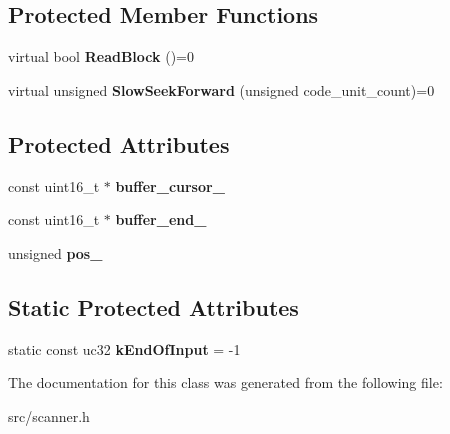 \subsection*{Protected Member Functions}
\begin{DoxyCompactItemize}
\item 
\hypertarget{classv8_1_1internal_1_1_utf16_character_stream_a1b78e988d057208df027c0c83431d590}{}virtual bool {\bfseries Read\+Block} ()=0\label{classv8_1_1internal_1_1_utf16_character_stream_a1b78e988d057208df027c0c83431d590}

\item 
\hypertarget{classv8_1_1internal_1_1_utf16_character_stream_a00765ecbd74b2682be94b1ed489f1849}{}virtual unsigned {\bfseries Slow\+Seek\+Forward} (unsigned code\+\_\+unit\+\_\+count)=0\label{classv8_1_1internal_1_1_utf16_character_stream_a00765ecbd74b2682be94b1ed489f1849}

\end{DoxyCompactItemize}
\subsection*{Protected Attributes}
\begin{DoxyCompactItemize}
\item 
\hypertarget{classv8_1_1internal_1_1_utf16_character_stream_ac90ab8606aa8b34c62cb4d0005fe64a6}{}const uint16\+\_\+t $\ast$ {\bfseries buffer\+\_\+cursor\+\_\+}\label{classv8_1_1internal_1_1_utf16_character_stream_ac90ab8606aa8b34c62cb4d0005fe64a6}

\item 
\hypertarget{classv8_1_1internal_1_1_utf16_character_stream_a13a08f07ebe18c4632db92a4e9f19e7c}{}const uint16\+\_\+t $\ast$ {\bfseries buffer\+\_\+end\+\_\+}\label{classv8_1_1internal_1_1_utf16_character_stream_a13a08f07ebe18c4632db92a4e9f19e7c}

\item 
\hypertarget{classv8_1_1internal_1_1_utf16_character_stream_a2ef4825c286a22cf416e4dd976554076}{}unsigned {\bfseries pos\+\_\+}\label{classv8_1_1internal_1_1_utf16_character_stream_a2ef4825c286a22cf416e4dd976554076}

\end{DoxyCompactItemize}
\subsection*{Static Protected Attributes}
\begin{DoxyCompactItemize}
\item 
\hypertarget{classv8_1_1internal_1_1_utf16_character_stream_ab9485ef6f823b9629ad87a3070f9448a}{}static const uc32 {\bfseries k\+End\+Of\+Input} = -\/1\label{classv8_1_1internal_1_1_utf16_character_stream_ab9485ef6f823b9629ad87a3070f9448a}

\end{DoxyCompactItemize}


The documentation for this class was generated from the following file\+:\begin{DoxyCompactItemize}
\item 
src/scanner.\+h\end{DoxyCompactItemize}
